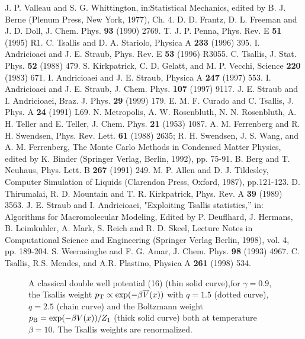 \begin{thebibliography}{16}

 J. P. Valleau and S. G. Whittington, in:Statistical Mechanics,
edited by B. J. Berne (Plenum Press, New York, 1977), Ch. 4.
 D. D. Frantz, D. L. Freeman and J. D. Doll, J. Chem. Phys.
{\bf 93} (1990)
2769.
 T. J. P. Penna, Phys. Rev. E {\bf 51} (1995) R1.
 C. Tsallis and D. A. Stariolo, Physica A {\bf 233} (1996) 395.
 I. Andricioaei and J. E. Straub, Phys. Rev. E {\bf 53}
(1996) R3055.
 C. Tsallis, J. Stat. Phys. {\bf 52} (1988) 479.
 S. Kirkpatrick, C. D. Gelatt, and M. P. Vecchi, Science {\bf
220} (1983) 671.
 I. Andricioaei and J. E. Straub, Physica A {\bf 247} (1997) 553.
 I. Andricioaei and J. E. Straub, J. Chem. Phys. {\bf 107}
(1997) 9117.
 J. E. Straub and I. Andricioaei, Braz. J. Phys. {\bf 29}
(1999) 179.
 E. M. F. Curado and C. Tsallis, J. Phys. A {\bf 24} (1991) L69.
 N. Metropolis, A. W. Rosenbluth, N. N. Rosenbluth, A. H. Teller 
and E. Teller, J. Chem. Phys. {\bf 21} (1953) 1087.
 A. M. Ferrenberg and R. H. Swendsen, Phys. Rev. Lett. {\bf
61} (1988) 2635; R. H.
Swendsen, J. S. Wang, and A. M. Ferrenberg, The Monte Carlo Methods in
Condensed Matter
Physics, edited by K. Binder (Springer Verlag, Berlin, 1992), pp. 75-91.
 B. Berg and T. Neuhaus, Phys. Lett. B {\bf 267} (1991) 249.
 M. P. Allen and D. J. Tildesley, Computer Simulation of Liquids
(Clarendon Press, Oxford, 1987), pp.121-123.
 D. Thirumalai, R. D. Mountain and T. R. Kirkpatrick, Phys.
Rev. A {\bf 39} (1989) 3563.
 J. E. Straub and I. Andricioaei, "Exploiting Tsallis
statistics,'' in: Algorithms for Macromolecular Modeling, Edited by P.
Deuflhard, J. Hermans, B. Leimkuhler, A. Mark, S. Reich and R. D. Skeel,
Lecture Notes in Computational Science and Engineering (Springer Verlag
Berlin, 1998), vol. 4, pp. 189-204.
 S. Weerasinghe and F. G. Amar, J. Chem. Phys. {\bf 98} (1993)
4967.
 C. Tsallis, R.S. Mendes, and A.R. Plastino, Physica A {\bf
261} (1998) 534.
\end{thebibliography}

\newpage

\begin{figure}[th]
\epsfxsize=8cm
 \centerline{}
\caption{A classical double well  potential (16) (thin solid curve),for $\gamma=0.9$, the Tsallis weight  $p_{\rm T} \propto \exp(-\beta \overline{V}(x))$ with $q=1.5$  (dotted curve), $q=2.5$ (chain curve) and the Boltzmann  weight $p_{\rm B}=\exp(-\beta V(x))/Z_{1}$ (thick solid curve)  both at temperature $\beta=10$. The Tsallis weights are  renormalized.}
\label{fig:1}
\end{figure}

